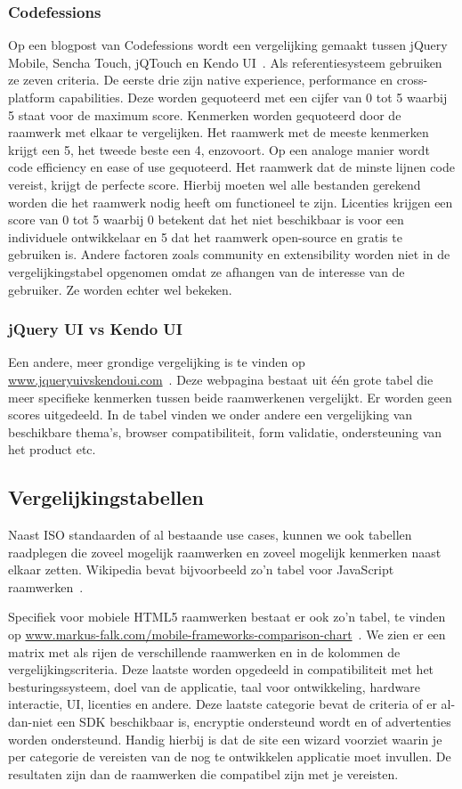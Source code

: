 \subsubsection{Codefessions}
Op een blogpost van Codefessions wordt een vergelijking gemaakt tussen jQuery Mobile, Sencha Touch, jQTouch en Kendo UI~\cite{Sarrafi2012}.  Als referentiesysteem gebruiken ze zeven criteria.  De eerste drie zijn native experience, performance en cross-platform capabilities.  Deze worden gequoteerd met een cijfer van 0 tot 5 waarbij 5 staat voor de maximum score. Kenmerken worden gequoteerd door de raamwerk met elkaar te vergelijken.  Het raamwerk met de meeste kenmerken krijgt een 5, het tweede beste een 4, enzovoort.  Op een analoge manier wordt code efficiency en ease of use gequoteerd.  Het raamwerk dat de minste lijnen code vereist, krijgt de perfecte score. Hierbij moeten wel alle bestanden gerekend worden die het raamwerk nodig heeft om functioneel te zijn. Licenties krijgen een score van 0 tot 5 waarbij 0 betekent dat het niet beschikbaar is voor een individuele ontwikkelaar en 5 dat het raamwerk open-source en gratis te gebruiken is. Andere factoren zoals community en extensibility worden niet in de vergelijkingstabel opgenomen omdat ze afhangen van de interesse van de gebruiker.  Ze worden echter wel bekeken.

\subsubsection{jQuery UI vs Kendo UI}
Een andere, meer grondige vergelijking is te vinden op \url{www.jqueryuivskendoui.com}~\cite{Bristowe}.  Deze webpagina bestaat uit één grote tabel die meer specifieke kenmerken tussen beide raamwerkenen vergelijkt.  Er worden geen scores uitgedeeld. In de tabel vinden we onder andere een vergelijking van beschikbare thema's,  browser compatibiliteit,  form validatie,  ondersteuning van het product etc.

\subsection{Vergelijkingstabellen}
Naast ISO standaarden of al bestaande use cases, kunnen we ook tabellen raadplegen die zoveel mogelijk raamwerken en zoveel mogelijk kenmerken naast elkaar zetten.  Wikipedia bevat bijvoorbeeld zo'n tabel voor JavaScript raamwerken~\cite{Wikipedia}.  

Specifiek voor mobiele HTML5 raamwerken bestaat er ook zo'n tabel,  te vinden op \url{www.markus-falk.com/mobile-frameworks-comparison-chart}~\cite{Falk2011}.  We zien er een matrix met als rijen de verschillende raamwerken en in de kolommen de vergelijkingscriteria.  Deze laatste worden opgedeeld in compatibiliteit met het besturingssysteem,  doel van de applicatie,  taal voor ontwikkeling,  hardware interactie,  UI,  licenties en andere.  Deze laatste categorie bevat de criteria of er al-dan-niet een SDK beschikbaar is, encryptie ondersteund wordt en of advertenties worden ondersteund.  Handig hierbij is dat de site een wizard voorziet waarin je per categorie de vereisten van de nog te ontwikkelen applicatie moet invullen.  De resultaten zijn dan de raamwerken die compatibel zijn met je vereisten.

